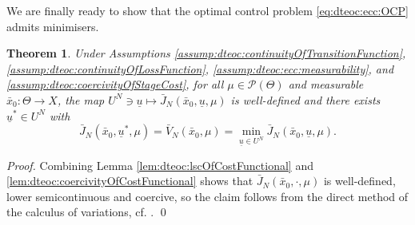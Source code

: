 \documentclass[letterpaper, 10 pt, conference]{IEEEconf}  %
\newcommand{\Pbs}{\mathcal{P}} %
\newcommand{\es}{\bar{x}} %
\newcommand{\is}[1]{{\underline{#1}}} %
\theoremstyle{theorem}
\newtheorem{theorem}{Theorem}
\theoremstyle{definition}
\theoremstyle{remark}
\begin{document}
We are finally ready to show that the optimal control problem \eqref{eq:dteoc:ecc:OCP} admits minimisers. 
\begin{theorem} \label{thm:dteoc:existenceOfMinimisers}
Under Assumptions \ref{assump:dteoc:continuityOfTransitionFunction}, \ref{assump:dteoc:continuityOfLossFunction}, \ref{assump:dteoc:ecc:measurability}, and \ref{assump:dteoc:coercivityOfStageCost}, for all $\mu \in \Pbs(\Theta)$ and measurable $\es_0\colon \Theta\rightarrow X$,
the map $U^N \ni \is{u} \mapsto \bar J_N(\es_0,\is{u},\mu)$ is well-defined and there exists $\is{u}^\ast \in U^N$ with
\begin{equation}
    \bar J_N(\es_0, \is{u}^\ast, \mu) = \bar V_N(\es_0,\mu) = \min_{\is{u} \in U^N} \bar J_N(\es_0,\is{u},\mu).
\end{equation}
\end{theorem}
\begin{proof}
Combining Lemma \ref{lem:dteoc:lscOfCostFunctional} and \ref{lem:dteoc:coercivityOfCostFunctional} shows that $\bar J_N(\es_0, \cdot, \mu)$ is well-defined, lower semicontinuous and coercive, so the claim follows from the direct method of the calculus of variations, cf. \cite[Theorem~1.15]{dalmaso1993introduction}. \qed
\end{proof}
\end{document}
